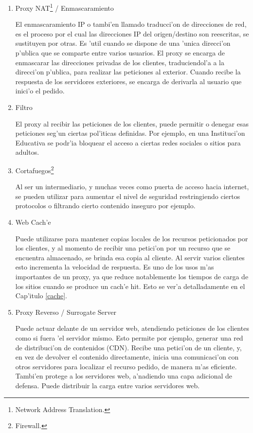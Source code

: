 \begin{enumerate}
\item Proxy NAT\footnote{Network Address Translation.} / Enmascaramiento

El enmascaramiento IP o tambi'en llamado traducci'on de direcciones de red, es el proceso por el cual las direcciones IP del origen/destino son reescritas, se sustituyen por otras. Es 'util cuando se dispone de una 'unica direcci'on p'ublica que se comparte entre varios usuarios. El proxy se encarga de enmascarar las direcciones privadas de los clientes, traduciendol'a a la direcci'on p'ublica, para realizar las peticiones al exterior. Cuando recibe la respuesta de los servidores exteriores, se encarga de derivarla al usuario que inici'o el pedido.

\item Filtro

El proxy al recibir las peticiones de los clientes, puede permitir o denegar esas peticiones seg'un ciertas pol'iticas definidas. Por ejemplo, en una Instituci'on Educativa se podr'ia bloquear el acceso a ciertas redes sociales o sitios para adultos.

\item Cortafuegos\footnote{Firewall.}

Al ser un intermediario, y muchas veces como puerta de acceso hacia internet, se pueden utilizar para aumentar el nivel de seguridad restringiendo ciertos protocolos o filtrando cierto contenido inseguro por ejemplo.

\item Web Cach'e

Puede utilizarse para mantener copias locales de los recursos peticionados por los clientes, y al momento de recibir una petici'on por un recurso que se encuentra almacenado, se brinda esa copia al cliente. Al servir varios clientes esto incrementa la velocidad de respuesta. Es uno de los usos m'as importantes de un proxy, ya que reduce notablemente los tiempos de carga de los sitios cuando se produce un cach'e hit. Esto se ver'a detalladamente en el Cap'itulo \ref{cache}.

\item Proxy Reverso / Surrogate Server

Puede actuar delante de un servidor web, atendiendo peticiones de los clientes como si fuera 'el servidor mismo. Esto permite por ejemplo, generar una red de distribuci'on de contenidos (CDN). Recibe una petici'on de un cliente, y, en vez de devolver el contenido directamente, inicia una comunicaci'on con otros servidores para localizar el recurso pedido, de manera m'as eficiente. Tambi'en protege a los servidores web, a'nadiendo una capa adicional de defensa. Puede distribuir la carga entre varios servidores web.


\end{enumerate}
